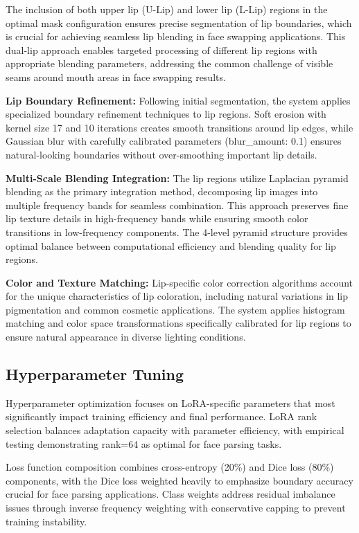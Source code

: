 \documentclass[12pt,a4paper]{report}
\begin{document}
The inclusion of both upper lip (U-Lip) and lower lip (L-Lip) regions in the optimal mask configuration ensures precise segmentation of lip boundaries, which is crucial for achieving seamless lip blending in face swapping applications. This dual-lip approach enables targeted processing of different lip regions with appropriate blending parameters, addressing the common challenge of visible seams around mouth areas in face swapping results.

\textbf{Lip Boundary Refinement:} Following initial segmentation, the system applies specialized boundary refinement techniques to lip regions. Soft erosion with kernel size 17 and 10 iterations creates smooth transitions around lip edges, while Gaussian blur with carefully calibrated parameters (blur\_amount: 0.1) ensures natural-looking boundaries without over-smoothing important lip details.

\textbf{Multi-Scale Blending Integration:} The lip regions utilize Laplacian pyramid blending as the primary integration method, decomposing lip images into multiple frequency bands for seamless combination. This approach preserves fine lip texture details in high-frequency bands while ensuring smooth color transitions in low-frequency components. The 4-level pyramid structure provides optimal balance between computational efficiency and blending quality for lip regions.

\textbf{Color and Texture Matching:} Lip-specific color correction algorithms account for the unique characteristics of lip coloration, including natural variations in lip pigmentation and common cosmetic applications. The system applies histogram matching and color space transformations specifically calibrated for lip regions to ensure natural appearance in diverse lighting conditions.

\subsection{Hyperparameter Tuning}

Hyperparameter optimization focuses on LoRA-specific parameters that most significantly impact training efficiency and final performance. LoRA rank selection balances adaptation capacity with parameter efficiency, with empirical testing demonstrating rank=64 as optimal for face parsing tasks.

Loss function composition combines cross-entropy (20\%) and Dice loss (80\%) components, with the Dice loss weighted heavily to emphasize boundary accuracy crucial for face parsing applications. Class weights address residual imbalance issues through inverse frequency weighting with conservative capping to prevent training instability.
\end{document}
